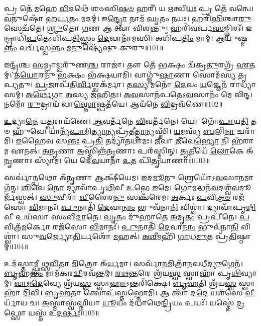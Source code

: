 𑌪𑍍𑌰 𑌤𑍇᳴ \ul{𑌮}\-𑌹𑍇 \ul{𑌵𑌿}\-𑌦𑌥𑍇᳴ 𑌶𑍞𑌸𑌿\-\ul{𑌷}\-\-\ul{𑍞} 𑌹𑌰𑍀॑।
𑌯 \ul{𑌋}\-𑌤𑍍𑌵𑌿\-\ul{𑌯𑌃} 𑌪𑍍𑌰 𑌤𑍇᳴ 𑌵𑌨𑍍𑌵𑍇।
\-\ul{𑌵}\-𑌨𑍁𑌷𑍋᳴ 𑌹\-\ul{𑌰𑍍𑌯}\-𑌤𑌂 𑌮𑌦𑌮𑍍॑।
𑌇\-\ul{𑌨𑍍𑌦𑍍𑌰𑍋} 𑌨𑌾𑌮᳴ \ul{𑌘𑍃}\-𑌤𑌂 𑌨𑌯𑌃।
𑌹𑌰𑌿᳴\-\ul{𑌭𑌿}\-𑌶𑍍𑌚𑌾\-\ul{𑌰𑍁} 𑌸𑍇𑌚᳴𑌤𑍇।
\-\ul{𑌶𑍍𑌰𑍁}\-𑌤𑍋 \ul{𑌗}\-𑌣 𑌆 𑌤𑍍𑌵𑌾᳴ 𑌵𑌿𑌶𑌨𑍍𑌤𑍁।
𑌹𑌰𑌿᳴𑌵𑌰𑍍𑌪\-\ul{𑌸}\-𑌙𑍍𑌗𑌿𑌰𑌃᳴।
𑌇𑌨𑍍𑌦𑍍𑌰𑌾𑌧𑌿᳴\-\ul{𑌪}\-𑌤𑍇\-𑌽𑌧𑌿᳴𑌪\-\ul{𑌤𑌿}\-𑌸𑍍𑌤𑍍𑌵𑌂 \ul{𑌦𑍇}\-𑌵𑌾𑌨𑌾᳴𑌮𑌸𑌿।
𑌅𑌧𑌿᳴𑌪\-\ul{𑌤𑌿𑌂} 𑌮𑌾𑌮𑍍।
𑌆𑌯𑍁᳴𑌷𑍍𑌮\-\ul{𑌨𑍍𑌤𑌂} 𑌵𑌰𑍍𑌚᳴𑌸𑍍𑌵𑌨𑍍𑌤𑌂 𑌮\-\ul{𑌨𑍁}\-𑌷𑍍𑌯𑍇᳴𑌷𑍁 𑌕𑍁𑌰𑍁॥101॥

𑌇𑌨𑍍𑌦𑍍𑌰᳴𑌶𑍍𑌚 \ul{𑌸}\-𑌮𑍍𑌰𑌾𑌡𑍍𑌵𑌰𑍁᳴𑌣\-\ul{𑌶𑍍𑌚} 𑌰𑌾𑌜𑌾॑।
𑌤𑍗 𑌤𑍇᳴ \ul{𑌭}\-𑌕𑍍𑌷𑌂 𑌚᳴𑌕𑍍𑌰\-\ul{𑌤𑍁}\-𑌰𑌗𑍍𑌰᳴ \ul{𑌏}\-𑌤𑌮𑍍।
𑌤\-\ul{𑌯𑍋}\-𑌰𑌨𑍁᳴ \ul{𑌭}\-𑌕𑍍𑌷𑌂 𑌭᳴𑌕𑍍𑌷𑌯𑌾𑌮𑌿।
𑌵𑌾𑌗𑍍𑌜𑍁᳴\-\ul{𑌷𑌾}\-𑌣𑌾 𑌸𑍋𑌮᳴𑌸𑍍𑌯 𑌤𑍃𑌪𑍍𑌯𑌤𑍁।
\-\ul{𑌪𑍍𑌰}\-𑌜𑌾𑌪᳴𑌤𑌿\-\ul{𑌰𑍍𑌵𑌿}\-𑌶𑍍𑌵𑌕᳴𑌰𑍍𑌮𑌾।
𑌤\-\ul{𑌸𑍍𑌯} 𑌮𑌨𑍋᳴ \ul{𑌦𑍇}\-𑌵𑌂 \ul{𑌯}\-𑌜𑍍𑌞𑍇𑌨᳴ 𑌰𑌾𑌧𑍍𑌯𑌾𑌸𑌮𑍍।
\-\ul{𑌅}\-\-\ul{𑌰𑍍𑌥𑍇}\-𑌗𑌾 \ul{𑌅}\-𑌸𑍍𑌯 𑌜᳴𑌹𑌿𑌤𑌃।
\-\ul{𑌅}\-\-\ul{𑌵}\-𑌸𑌾𑌨᳴𑌪𑌤𑍇\-𑌽\-\ul{𑌵}\-𑌸𑌾𑌨𑌂᳴ 𑌮𑍇 𑌵𑌿𑌨𑍍𑌦।
𑌨𑌮𑍋᳴ \ul{𑌰𑍁}\-𑌦𑍍𑌰𑌾𑌯᳴ 𑌵𑌾\-\ul{𑌸𑍍𑌤𑍋}\-𑌷𑍍𑌪𑌤᳴𑌯𑍇।
𑌆𑌯᳴𑌨𑍇 \ul{𑌵𑌿}\-𑌦𑍍𑌰𑌵᳴𑌣𑍇॥102॥

\-\ul{𑌉}\-𑌦𑍍𑌯𑌾\-\ul{𑌨𑍇} 𑌯\-\ul{𑌤𑍍𑌪}\-𑌰𑌾𑌯᳴𑌣𑍇।
\-\ul{𑌆}\-𑌵𑌰𑍍𑌤᳴𑌨𑍇 \ul{𑌵𑌿}\-𑌵𑌰𑍍𑌤᳴𑌨𑍇।
𑌯𑍋 𑌗𑍋᳴\-\ul{𑌪𑌾}\-𑌯\-\ul{𑌤𑌿} 𑌤𑍞 𑌹𑍁᳴𑌵𑍇।
𑌯𑌾𑌨𑍍𑌯᳴\-\ul{𑌪𑌾}\-𑌮𑌿\-\ul{𑌤𑍍𑌯𑌾}\-𑌨𑍍𑌯𑌪𑍍𑌰᳴𑌤𑍀\-\ul{𑌤𑍍𑌤𑌾}\-𑌨𑍍𑌯𑌸𑍍𑌮𑌿᳴।
\-\ul{𑌯}\-𑌮𑌸𑍍𑌯᳴ \ul{𑌬}\-𑌲𑌿\-\ul{𑌨𑌾} 𑌚𑌰𑌾᳴𑌮𑌿।
\-\ul{𑌇}\-𑌹𑍈𑌵 𑌸\-\ul{𑌨𑍍𑌤𑌃} 𑌪𑍍𑌰\-\ul{𑌤𑌿} 𑌤𑌦𑍍𑌯𑌾᳴𑌤𑌯𑌾𑌮𑌃।
\-\ul{𑌜𑍀}\-𑌵𑌾 \ul{𑌜𑍀}\-𑌵𑍇\-\ul{𑌭𑍍𑌯𑍋} 𑌨𑌿 𑌹᳴𑌰𑌾𑌮 𑌏𑌨𑌤𑍍।
\-\ul{𑌅}\-\-\ul{𑌨𑍃}\-𑌣𑌾 \ul{𑌅}\-𑌸𑍍𑌮𑌿𑌨𑍍𑌨᳴\-\ul{𑌨𑍃}\-𑌣𑌾𑌃 𑌪𑌰᳴𑌸𑍍𑌮𑌿𑌨𑍍।
\-\ul{𑌤𑍃}\-𑌤𑍀𑌯𑍇᳴ \ul{𑌲𑍋}\-𑌕𑍇 𑌅᳴\-\ul{𑌨𑍃}\-𑌣𑌾𑌃 𑌸𑍍𑌯𑌾᳴𑌮।
𑌯𑍇 𑌦𑍇᳴\-\ul{𑌵}\-𑌯𑌾𑌨𑌾᳴ \ul{𑌉}\-𑌤 𑌪𑌿᳴\-\ul{𑌤𑍃}\-𑌯𑌾𑌣𑌾𑌃॑॥103॥

𑌸𑌰𑍍𑌵𑌾॑\-\ul{𑌨𑍍𑌪}\-𑌥𑍋 𑌅᳴\-\ul{𑌨𑍃}\-𑌣𑌾 𑌆𑌕𑍍𑌷𑍀᳴𑌯𑍇𑌮।
\-\ul{𑌇}\-𑌦\-\ul{𑌮𑍂}\-𑌨𑍁 𑌶𑍍𑌰𑍇𑌯𑍋᳴\-𑌽\-\ul{𑌵}\-𑌸𑌾\-\ul{𑌨}\-𑌮𑌾 𑌗᳴𑌨𑍍𑌮।
\-\ul{𑌶𑌿}\-𑌵𑍇 \ul{𑌨𑍋} 𑌦𑍍𑌯𑌾𑌵𑌾᳴𑌪𑍃\-\ul{𑌥𑌿}\-𑌵𑍀 \ul{𑌉}\-𑌭𑍇 \ul{𑌇}\-𑌮𑍇।
𑌗𑍋\-\ul{𑌮}\-𑌦𑍍𑌧𑌨᳴\-\ul{𑌵}\-𑌦𑌶𑍍𑌵᳴\-\ul{𑌵}\-𑌦𑍂𑌰𑍍𑌜᳴𑌸𑍍𑌵𑌤𑍍।
\-\ul{𑌸𑍁}\-𑌵𑍀𑌰𑌾᳴ \ul{𑌵𑍀}\-𑌰𑍈𑌰\-\ul{𑌨𑍁}\- 𑌸𑌞𑍍𑌚᳴𑌰𑍇𑌮।
\-\ul{𑌅}\-𑌰𑍍𑌕𑌃 \ul{𑌪}\-𑌵𑌿\-\ul{𑌤𑍍𑌰}\-\-\ul{𑍞} 𑌰𑌜᳴𑌸𑍋 \ul{𑌵𑌿}\-𑌮𑌾𑌨𑌃᳴।
\-\ul{𑌪𑍁}\-𑌨𑌾𑌤𑌿᳴ \ul{𑌦𑍇}\-𑌵𑌾\-\ul{𑌨𑌾𑌂} 𑌭𑍁𑌵᳴𑌨𑌾\-\ul{𑌨𑌿} 𑌵𑌿𑌶𑍍𑌵𑌾॑।
𑌦𑍍𑌯𑌾𑌵𑌾᳴𑌪𑍃\-\ul{𑌥𑌿}\-𑌵𑍀 𑌪𑌯᳴𑌸𑌾 𑌸𑌂𑌵𑌿\-\ul{𑌦𑌾}\-𑌨𑍇।
\-\ul{𑌘𑍃}\-𑌤𑌂 𑌦𑍁᳴𑌹𑌾𑌤𑍇 \ul{𑌅}\-𑌮𑍃\-\ul{𑌤𑌂} 𑌪𑍍𑌰𑌪𑍀᳴𑌨𑍇।
\-\ul{𑌪}\-𑌵𑌿𑌤𑍍𑌰᳴\-\ul{𑌮}\-𑌰𑍍𑌕𑍋 𑌰𑌜᳴𑌸𑍋 \ul{𑌵𑌿}\-𑌮𑌾𑌨𑌃᳴।
\-\ul{𑌪𑍁}\-𑌨𑌾𑌤𑌿᳴ \ul{𑌦𑍇}\-𑌵𑌾\-\ul{𑌨𑌾𑌂} 𑌭𑍁𑌵᳴𑌨𑌾\-\ul{𑌨𑌿} 𑌵𑌿𑌶𑍍𑌵𑌾॑।
𑌸𑍁\-\ul{𑌵}\-𑌰𑍍𑌜𑍍𑌯𑍋\-\ul{𑌤𑌿}\-𑌰𑍍𑌯𑌶𑍋᳴ \ul{𑌮}\-𑌹𑌤𑍍।
\-\ul{𑌅}\-\-\ul{𑌶𑍀}\-𑌮𑌹𑌿᳴ \ul{𑌗𑌾}\-𑌧\-\ul{𑌮𑍁}\-𑌤 𑌪𑍍𑌰᳴\-\ul{𑌤𑌿}\-𑌷𑍍𑌠𑌾𑌮𑍍॥104॥\anuvakamend[\-\ul{𑌚𑌾}\-\-\ul{𑌤}\-\-\ul{𑌯}\-\-\ul{𑌤} \ul{𑌶𑍍𑌰𑍀}\-\-\ul{𑌣𑍀}\-\-\ul{𑌤𑌾}\-\-\ul{𑍞} \ul{𑌸}\-𑌤𑍍𑌯\-\ul{𑌮𑌾}\-𑌹𑍁𑌰᳴𑌶𑍀𑌮𑌹𑌿 \ul{𑌗}\-𑌣𑍇 𑌕𑍁᳴𑌰𑍁 \ul{𑌵𑌿}\-𑌦𑍍𑌰𑌵᳴𑌣𑍇 𑌪𑌿\-\ul{𑌤𑍃}\-𑌯𑌾𑌣𑌾᳴ \ul{𑌅}\-𑌰𑍍𑌕𑍋 𑌰𑌜᳴𑌸𑍋 \ul{𑌵𑌿}\-𑌮𑌾\-\ul{𑌨}\-𑌸𑍍𑌤𑍍𑌰𑍀𑌣𑌿᳴ 𑌚]

𑌉𑌦᳴𑌸𑍍𑌤𑌾𑌮𑍍𑌫𑍍𑌸𑍀𑌥𑍍𑌸\-\ul{𑌵𑌿}\-𑌤𑌾 \ul{𑌮𑌿}\-𑌤𑍍𑌰𑍋 𑌅᳴\-\ul{𑌰𑍍𑌯}\-𑌮𑌾।
𑌸𑌰𑍍𑌵𑌾᳴\-\ul{𑌨}\-𑌮𑌿𑌤𑍍𑌰𑌾᳴𑌨\-𑌵𑌧𑍀\-\ul{𑌦𑍍𑌯𑍁}\-𑌗𑍇𑌨᳴।
\-\ul{𑌬𑍃}\-𑌹\-\ul{𑌨𑍍𑌤𑌂} 𑌮𑌾𑌮᳴𑌕𑌰\-\ul{𑌦𑍍𑌵𑍀}\-𑌰𑌵᳴𑌨𑍍𑌤𑌮𑍍।
\-\ul{𑌰}\-\-\ul{𑌥}\-\-\ul{𑌨𑍍𑌤}\-𑌰𑍇 𑌶𑍍𑌰᳴𑌯\-\ul{𑌸𑍍𑌵} 𑌸𑍍𑌵𑌾𑌹𑌾᳴ 𑌪𑍃\-\ul{𑌥𑌿}\-𑌵𑍍𑌯𑌾𑌮𑍍।
\-\ul{𑌵𑌾}\-\-\ul{𑌮}\-\-\ul{𑌦𑍇}\-𑌵𑍍𑌯𑍇 𑌶𑍍𑌰᳴𑌯\-\ul{𑌸𑍍𑌵} 𑌸𑍍𑌵𑌾\-\ul{𑌹𑌾}\-\-𑌽𑌨𑍍𑌤𑌰𑌿᳴𑌕𑍍𑌷𑍇।
\-\ul{𑌬𑍃}\-\-\ul{𑌹}\-𑌤𑌿 𑌶𑍍𑌰᳴𑌯\-\ul{𑌸𑍍𑌵} 𑌸𑍍𑌵𑌾𑌹𑌾᳴ \ul{𑌦𑌿}\-𑌵𑌿।
\-\ul{𑌬𑍃}\-\-\ul{𑌹}\-𑌤𑌾 𑌤𑍍𑌵𑍋𑌪᳴𑌸𑍍𑌤𑌭𑍍𑌨𑍋𑌮𑌿।
𑌆 𑌤𑍍𑌵𑌾᳴ 𑌦\-\ul{𑌦𑍇} 𑌯𑌶᳴𑌸𑍇 \ul{𑌵𑍀}\-𑌰𑍍𑌯𑌾᳴𑌯 𑌚।
\-\ul{𑌅}\-𑌸𑍍𑌮𑌾𑌸𑍍𑌵᳴𑌘𑍍𑌨𑌿𑌯𑌾 \ul{𑌯𑍂}\-𑌯𑌂 𑌦᳴𑌧𑌾𑌥𑍇\-\ul{𑌨𑍍𑌦𑍍𑌰𑌿}\-𑌯𑌂 𑌪𑌯𑌃᳴।
𑌯𑌸𑍍𑌤𑍇॑ \ul{𑌦𑍍𑌰}\-𑌫𑍍𑌸𑍋 𑌯𑌸𑍍𑌤᳴ 𑌉\-\ul{𑌦}\-\-\ul{𑌰𑍍}\-𑌷𑌃॥105॥

